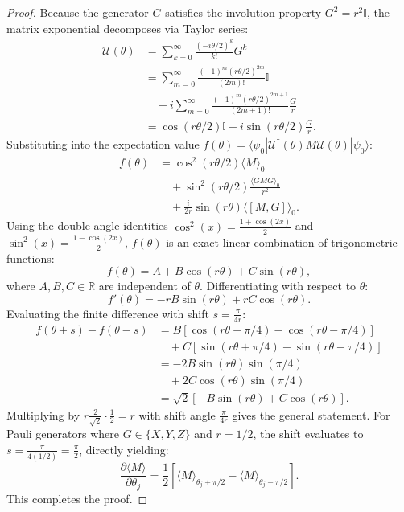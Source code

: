\documentclass[journal]{IEEEtran}
\begin{document}
\begin{proof}
Because the generator $G$ satisfies the involution property $G^2 = r^2 \mathbb{I}$, the matrix exponential decomposes via Taylor series:
\begin{align}
\mathcal{U}(\theta) &= \sum_{k=0}^{\infty} \frac{(-i \theta / 2)^k}{k!} G^k \nonumber \\
&= \sum_{m=0}^{\infty} \frac{(-1)^m (r\theta/2)^{2m}}{(2m)!} \mathbb{I} \nonumber \\
&\quad - i \sum_{m=0}^{\infty} \frac{(-1)^m (r\theta/2)^{2m+1}}{(2m+1)!} \frac{G}{r} \nonumber \\
&= \cos(r\theta/2) \mathbb{I} - i \sin(r\theta/2) \frac{G}{r}.
\end{align}
Substituting into the expectation value $f(\theta) = \langle \psi_0 | \mathcal{U}^\dagger(\theta) M \mathcal{U}(\theta) | \psi_0 \rangle$:
\begin{align}
f(\theta) &= \cos^2(r\theta / 2) \langle M \rangle_0 \nonumber \\
&\quad + \sin^2(r\theta / 2) \frac{\langle G M G \rangle_0}{r^2} \nonumber \\
&\quad + \frac{i}{2r} \sin(r\theta) \langle [M, G] \rangle_0.
\end{align}
Using the double-angle identities $\cos^2(x) = \frac{1+\cos(2x)}{2}$ and $\sin^2(x) = \frac{1-\cos(2x)}{2}$, $f(\theta)$ is an exact linear combination of trigonometric functions:
\begin{equation}
f(\theta) = A + B \cos(r\theta) + C \sin(r\theta),
\end{equation}
where $A, B, C \in \mathbb{R}$ are independent of $\theta$. Differentiating with respect to $\theta$:
\begin{equation}
f'(\theta) = -r B \sin(r\theta) + r C \cos(r\theta).
\label{eq:trig_derivative}
\end{equation}
Evaluating the finite difference with shift $s = \frac{\pi}{4r}$:
\begin{align}
f(\theta + s) - f(\theta - s) &= B \left[\cos(r\theta + \pi/4) - \cos(r\theta - \pi/4)\right] \nonumber \\
&\quad + C \left[\sin(r\theta + \pi/4) - \sin(r\theta - \pi/4)\right] \nonumber \\
&= -2 B \sin(r\theta) \sin(\pi/4) \nonumber \\
&\quad + 2 C \cos(r\theta) \sin(\pi/4) \nonumber \\
&= \sqrt{2} [-B \sin(r\theta) + C \cos(r\theta)].
\end{align}
Multiplying by $r \frac{2}{\sqrt{2}} \cdot \frac{1}{2} = r$ with shift angle $\frac{\pi}{4r}$ gives the general statement. For Pauli generators where $G \in \{X, Y, Z\}$ and $r = 1/2$, the shift evaluates to $s = \frac{\pi}{4(1/2)} = \frac{\pi}{2}$, directly yielding:
\begin{equation}
\frac{\partial \langle M \rangle}{\partial \theta_j} = \frac{1}{2} \left[ \langle M \rangle_{\theta_j + \pi/2} - \langle M \rangle_{\theta_j - \pi/2} \right].
\end{equation}
This completes the proof.
\end{proof}
\end{document}
